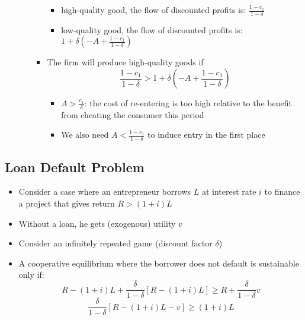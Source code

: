 \documentclass[a4paper]{article}
\begin{document}
\begin{itemize}
\begin{itemize}
\begin{itemize}
            \begin{itemize}
                \item high-quality good, the flow of discounted profits is: $\frac{1-c_1}{1-\delta}$
                \item low-quality good, the flow of discounted profits is: $1+\delta(-A+\frac{1-c_1}{1-\delta})$
            \end{itemize}
            \item The firm will produce high-quality goods if 
            \[\frac{1-c_1}{1-\delta}>1+\delta(-A+\frac{1-c_1}{1-\delta}) \]
            \begin{itemize}
                \item $A>\frac{c_1}{\delta}$: the cost of re-entering is too high relative to the benefit from cheating the consumer this period
                \item We also need $A<\frac{1-c_1}{1-\delta}$ to induce entry in the first place
            \end{itemize}
        \end{itemize}
    \end{itemize}
\end{itemize}


\subsection{Loan Default Problem}
\begin{itemize}
    \item Consider a case where an entrepreneur borrows $L$ at interest rate $i$ to finance a project that gives return $R>(1+i)L$
    \item Without a loan, he gets (exogenous) utility $v$
    \item Consider an infinitely repeated game (discount factor $\delta$)
    \item A cooperative equilibrium where the borrower does not default is sustainable only if:
    \[ R-(1+i)L+\frac{\delta}{1-\delta}[R-(1+i)L]\geq R+\frac{\delta}{1-\delta}v \]
    \[\frac{\delta}{1-\delta}[R-(1+i)L-v]\geq (1+i)L\]
\end{itemize}
\end{document}
